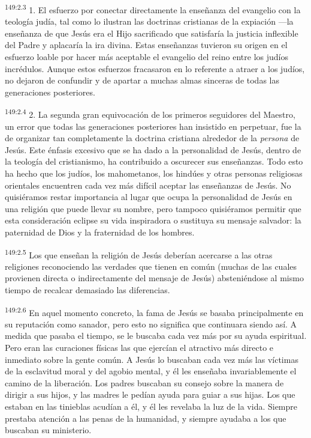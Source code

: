 \par 
\textsuperscript{149:2.3} 1. El esfuerzo por conectar directamente la enseñanza del evangelio con la teología judía, tal como lo ilustran las doctrinas cristianas de la expiación ---la enseñanza de que Jesús era el Hijo sacrificado que satisfaría la justicia inflexible del Padre y aplacaría la ira divina. Estas enseñanzas tuvieron su origen en el esfuerzo loable por hacer más aceptable el evangelio del reino entre los judíos incrédulos. Aunque estos esfuerzos fracasaron en lo referente a atraer a los judíos, no dejaron de confundir y de apartar a muchas almas sinceras de todas las generaciones posteriores.

\par 
\textsuperscript{149:2.4} 2. La segunda gran equivocación de los primeros seguidores del Maestro, un error que todas las generaciones posteriores han insistido en perpetuar, fue la de organizar tan completamente la doctrina cristiana alrededor de la \textit{persona} de Jesús. Este énfasis excesivo que se ha dado a la personalidad de Jesús, dentro de la teología del cristianismo, ha contribuido a oscurecer sus enseñanzas. Todo esto ha hecho que los judíos, los mahometanos, los hindúes y otras personas religiosas orientales encuentren cada vez más difícil aceptar las enseñanzas de Jesús. No quisiéramos restar importancia al lugar que ocupa la personalidad de Jesús en una religión que puede llevar su nombre, pero tampoco quisiéramos permitir que esta consideración eclipse su vida inspiradora o sustituya su mensaje salvador: la paternidad de Dios y la fraternidad de los hombres.

\par 
\textsuperscript{149:2.5} Los que enseñan la religión de Jesús deberían acercarse a las otras religiones reconociendo las verdades que tienen en común (muchas de las cuales provienen directa o indirectamente del mensaje de Jesús) absteniéndose al mismo tiempo de recalcar demasiado las diferencias.

\par 
\textsuperscript{149:2.6} En aquel momento concreto, la fama de Jesús se basaba principalmente en su reputación como sanador, pero esto no significa que continuara siendo así. A medida que pasaba el tiempo, se le buscaba cada vez más por su ayuda espiritual. Pero eran las curaciones físicas las que ejercían el atractivo más directo e inmediato sobre la gente común. A Jesús lo buscaban cada vez más las víctimas de la esclavitud moral y del agobio mental, y él les enseñaba invariablemente el camino de la liberación. Los padres buscaban su consejo sobre la manera de dirigir a sus hijos, y las madres le pedían ayuda para guiar a sus hijas. Los que estaban en las tinieblas acudían a él, y él les revelaba la luz de la vida. Siempre prestaba atención a las penas de la humanidad, y siempre ayudaba a los que buscaban su ministerio.

